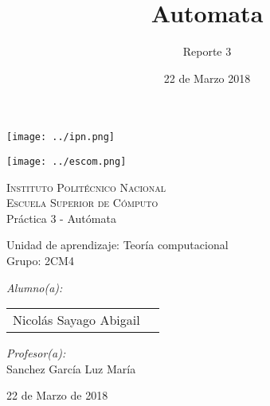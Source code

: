 \documentclass[12pt]{article}
\date{ 22 de Marzo 2018}
\title{Automata}
\author{Reporte 3}
\begin{document}
		\begin{titlepage}
			\begin{center}
				
				
				\noindent
				\begin{minipage}{0.5\textwidth}
					\begin{flushleft} \large
						\texttt{[image: ../ipn.png]}
					\end{flushleft}
				\end{minipage}%
				\begin{minipage}{0.55\textwidth}
					\begin{flushright} \large
						\texttt{[image: ../escom.png]}
					\end{flushright}
				\end{minipage}
				
				\textsc{\LARGE Instituto Politécnico Nacional}\\[0.5cm]
				
				\textsc{\Large Escuela Superior de Cómputo}\\[1cm]
				
				
				{ \huge Práctica 3 - Autómata \\[1cm] }
				
				{ \Large Unidad de aprendizaje: Teoría computacional} \\[1cm]
				
				{ \Large Grupo: 2CM4 } \\[1cm]
				
				\noindent
				\begin{minipage}{0.5\textwidth}
					\begin{flushleft} \large
						\emph{Alumno(a):}\\
						
						\begin{tabular}{ll}
					     Nicolás Sayago Abigail\\
					\end{tabular}
					\end{flushleft}
				\end{minipage}%
				\begin{minipage}{0.5\textwidth}
					\begin{flushright} \large
						\emph{Profesor(a):} \\
						Sanchez García Luz María  \\
					\end{flushright}
				\end{minipage}
				
				\vfill
				
				{\large 22 de Marzo de 2018}
			\end{center}
		\end{titlepage}
	
\end{document}
